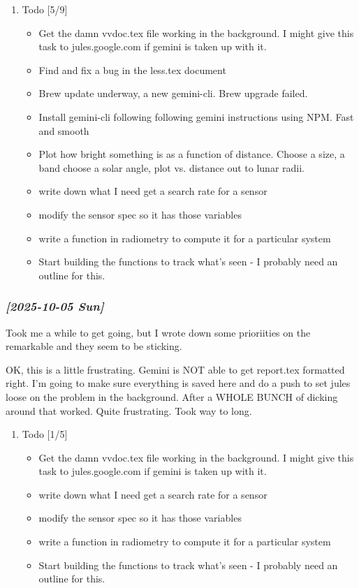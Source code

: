 \documentclass[11pt]{article}
\begin{document}
\begin{enumerate}
\item Todo  [5/9]
\label{sec:orgee3bb8e}
\begin{itemize}
\item[{$\boxtimes$}] Get the damn vvdoc.tex file working in the background.  I might give this task
to jules.google.com if gemini is taken up with it.
\item[{$\boxtimes$}] Find and fix a bug in the less.tex document
\item[{$\boxtimes$}] Brew update underway, a new gemini-cli. Brew upgrade failed.
\item[{$\boxtimes$}] Install gemini-cli following following gemini instructions using NPM.
Fast and smooth
\item[{$\boxtimes$}] Plot how bright something is as a function of distance. Choose a size, a band
choose a solar angle, plot vs. distance out to lunar radii.
\item[{$\square$}] write down what I need get a search rate for a sensor
\item[{$\square$}] modify the sensor spec so it has those variables
\item[{$\square$}] write a function in radiometry to compute it for a particular system
\item[{$\square$}] Start building the functions to track what's seen - I probably need
an outline for this.
\end{itemize}
\end{enumerate}


\subsubsection{\textit{[2025-10-05 Sun]}}
\label{sec:org266156d}
Took me a while to get going, but I wrote down some prioriities on the remarkable and
they seem to be sticking.

OK, this is a little frustrating.  Gemini is NOT able to get report.tex formatted right.
I'm going to make sure everything is saved here and do a push to set jules loose on the
problem in the background. After a WHOLE BUNCH of dicking around that worked. Quite
frustrating.  Took way to long.

\begin{enumerate}
\item Todo  [1/5]
\label{sec:org566e435}
\begin{itemize}
\item[{$\boxtimes$}] Get the damn vvdoc.tex file working in the background.  I might give this task
to jules.google.com if gemini is taken up with it.
\item[{$\square$}] write down what I need get a search rate for a sensor
\item[{$\square$}] modify the sensor spec so it has those variables
\item[{$\square$}] write a function in radiometry to compute it for a particular system
\item[{$\square$}] Start building the functions to track what's seen - I probably need
an outline for this.
\end{itemize}
\end{enumerate}
\end{document}
